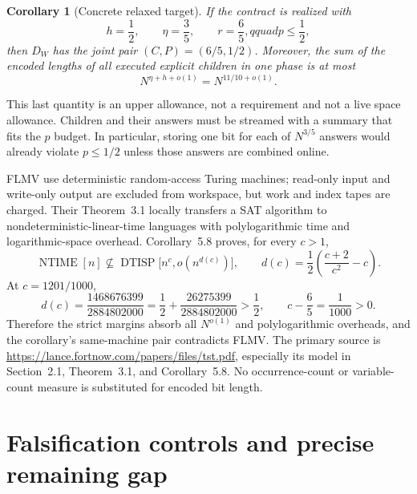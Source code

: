 \documentclass[11pt]{article}
\newtheorem{corollary}[theorem]{Corollary}
\newcommand{\DTISP}{\operatorname{DTISP}}
\begin{document}
\begin{corollary}[Concrete relaxed target]
If the contract is realized with
\[
 h=\frac12,\qquad \eta=\frac35,
 \qquad r=\frac65,qquad p\le\frac12,
\]
then $D_W$ has the joint pair $(C,P)=(6/5,1/2)$.  Moreover, the sum of the
encoded lengths of all executed explicit children in one phase is at most
\[
 N^{\eta+h+o(1)}=N^{11/10+o(1)}.
\]
\end{corollary}

This last quantity is an upper allowance, not a requirement and not a live
space allowance.  Children and their answers must be streamed with a summary
that fits the $p$ budget.  In particular, storing one bit for each of
$N^{3/5}$ answers would already violate $p\le1/2$ unless those answers are
combined online.

FLMV use deterministic random-access Turing machines; read-only input and
write-only output are excluded from workspace, but work and index tapes are
charged.  Their Theorem~3.1 locally transfers a SAT algorithm to
nondeterministic-linear-time languages with polylogarithmic time and
logarithmic-space overhead.  Corollary~5.8 proves, for every $c>1$,
\[
 \operatorname{NTIME}[n]\not\subseteq
 \DTISP\bigl[n^c,o(n^{d(c)})\bigr],
 \qquad d(c)=\frac12\left(\frac{c+2}{c^2}-c\right).
\]
At $c=1201/1000$,
\[
 d(c)=\frac{1468676399}{2884802000}
 =\frac12+\frac{26275399}{2884802000}>\frac12,
 \qquad c-\frac65=\frac1{1000}>0.
\]
Therefore the strict margins absorb all $N^{o(1)}$ and polylogarithmic
overheads, and the corollary's same-machine pair contradicts FLMV.  The
primary source is
\url{https://lance.fortnow.com/papers/files/tst.pdf}, especially its model in
Section~2.1, Theorem~3.1, and Corollary~5.8.  No occurrence-count or
variable-count measure is substituted for encoded bit length.

\section{Falsification controls and precise remaining gap}
\end{document}
